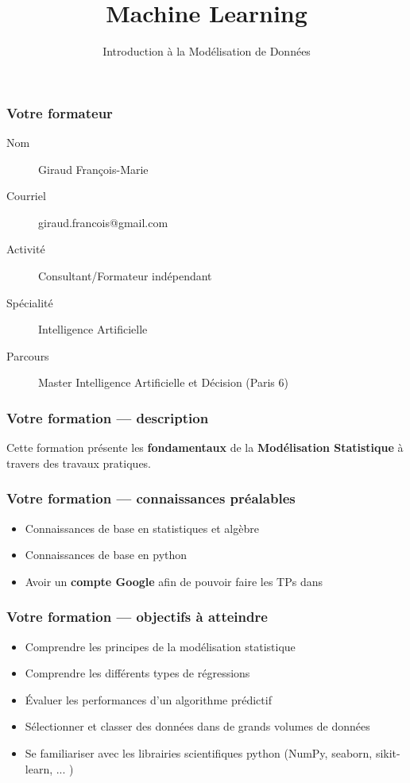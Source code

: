 \documentclass{formation}
\title{Machine Learning}
\subtitle{Introduction à la Modélisation de Données}
\begin{document}
\maketitle

\begin{frame}
  \frametitle{Votre formateur}
  \begin{description}
  \item[Nom] Giraud François-Marie
  \item[Courriel] giraud.francois@gmail.com
  \item[Activité] Consultant/Formateur indépendant
  \item[Spécialité] Intelligence Artificielle
  \item[Parcours] Master Intelligence Artificielle et Décision (Paris 6)
  \end{description}
\end{frame}

\begin{frame}
  \frametitle{Votre formation — description}
  Cette formation présente les \textbf{fondamentaux} de la \textbf{Modélisation Statistique} à travers des travaux pratiques. \\
\end{frame}

\begin{frame}
  \frametitle{Votre formation — connaissances préalables}
  \begin{itemize}
  \item Connaissances de base en statistiques et algèbre
  \item Connaissances de base en python
  \item Avoir un \textbf{compte Google} afin de pouvoir faire les TPs dans 
  \end{itemize}
\end{frame}

\begin{frame}
  \frametitle{Votre formation — objectifs à atteindre}
  \begin{itemize}
  \item Comprendre les principes de la modélisation statistique
  \item Comprendre les différents types de régressions
  \item Évaluer les performances d'un algorithme prédictif
  \item Sélectionner et classer des données dans de grands volumes de données
  \item Se familiariser avec les librairies scientifiques python (NumPy, seaborn, sikit-learn, ... )
  \end{itemize}
\end{frame}
\end{document}
